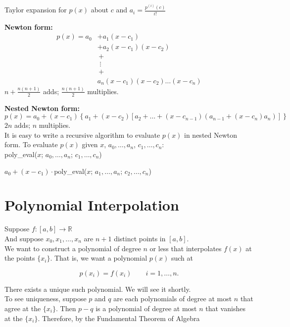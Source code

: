 \noindent Taylor expansion for $p(x)$ about $c$ and $a_i = \frac{p^{(i)}(c)}{i!}$

\noindent \textbf{Newton form:}
\begin{align}
p(x) = a_0 &+ a_1 (x-c_1) \\
           &+ a_2 (x-c_1)(x-c_2) \\
           &\,+ \\
           &\,\, \vdots \\
           &\,+ \\
           &a_n (x-c_1)(x-c_2)\dots(x-c_n)
\end{align}
$n+\frac{n(n+1)}{2}$ adds; $\frac{n(n+1)}{2}$ multiplies.

\noindent \textbf{Nested Newton form:}
$$
p(x) = a_0 + (x-c_1)\left\{a_1 + (x-c_2)\left[a_2 + \dots + (x-c_{n-1})(a_{n-1}+(x-c_n)a_n)\right]\right\}
$$
$2n$ adds; $n$ multiplies. \\

\noindent It is easy to write a recursive algorithm to evaluate $p(x)$ in nested Newton form. To evaluate $p(x)$ given $x$, $a_0, \dots, a_n$, $c_1, \dots, c_n$: \\

\quad \textsf{poly\_eval}($x$; $a_0, \dots, a_n$; $c_1, \dots, c_n$)

\qquad \qquad $a_0 + (x-c_1)\cdot $\textsf{poly\_eval}($x$; $a_1, \dots, a_n$; $c_2, \dots, c_n$)

\section{Polynomial Interpolation}

Suppose $f: [a,b] \rightarrow \mathbb{R}$ \\

\noindent And suppose $x_0, x_1, \dots , x_n$ are $n+1$ distinct points in $[a,b]$. \\

\noindent We want to construct a polynomial of degree $n$ or less that interpolates $f(x)$ at the points $\{x_i\}$. 
That is, we want a polynomial $p(x)$ such at

\begin{equation*}
    p(x_i) = f(x_i) \qquad i = 1, \dots, n.
\end{equation*}

There exists a unique such polynomial. We will see it shortly. \\

\noindent To see uniqueness, suppose $p$ and $q$ are each polynomials of degree at most $n$ that agree at the $\{x_i\}$. 
Then $p-q$ is a polynomial of degree at most $n$ that vanishes at the $\{x_i\}$. 
Therefore, by the Fundamental Theorem of Algebra


